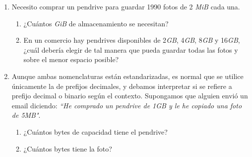 \documentclass[12pt]{article}
\begin{document}
\begin{enumerate}
\begin{enumerate}

        \item Necesito comprar un pendrive para guardar 1990 fotos de 2 \emph{MiB}
                cada una.

            \begin{enumerate}

                \item ¿Cuántos \emph{GiB} de almacenamiento se necesitan?

                \item En un comercio hay pendrives disponibles de 2\emph{GB},
                    4\emph{GB}, 8\emph{GB} y 16\emph{GB}, ¿cuál debería elegir de
                    tal manera que pueda guardar todas las fotos y sobre el menor
                    espacio posible?

            \end{enumerate}

        \item Aunque ambas nomenclaturas están estandarizadas, es normal que se
            utilice únicamente la de prefijos decimales, y debamos interpretar si
                se refiere a prefijo decimal o binario según el contexto.
                Supongamos que alguien envió un email diciendo: \emph{``He comprado
                un pendrive de 1GB y le he copiado una foto de 5MB"}.

            \begin{enumerate}

                \item ¿Cuántos bytes de capacidad tiene el pendrive?

                \item ¿Cuántos bytes tiene la foto?


\end{enumerate}
\end{enumerate}
\end{enumerate}
\end{document}
